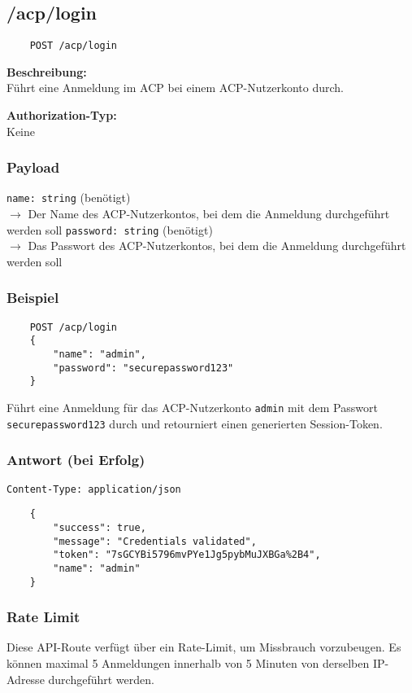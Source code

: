 \subsection{/acp/login}
\label{acpauth}

\begin{lstlisting}
    POST /acp/login
\end{lstlisting}

\textbf{Beschreibung:} \\
Führt eine Anmeldung im ACP bei einem ACP-Nutzerkonto durch.

\textbf{Authorization-Typ:} \\
Keine

\subsubsection{Payload}

\lstinline{name: string} (benötigt) \\
$\rightarrow$ Der Name des ACP-Nutzerkontos, bei dem die Anmeldung durchgeführt werden soll
\lstinline{password: string} (benötigt) \\
$\rightarrow$ Das Passwort des ACP-Nutzerkontos, bei dem die Anmeldung durchgeführt werden soll

\subsubsection{Beispiel}

\begin{lstlisting}
    POST /acp/login
    {
        "name": "admin",
        "password": "securepassword123"
    }
\end{lstlisting}

Führt eine Anmeldung für das ACP-Nutzerkonto \lstinline{admin} mit dem Passwort \lstinline{securepassword123} durch und retourniert einen generierten Session-Token.

\subsubsection{Antwort (bei Erfolg)}

\lstinline{Content-Type: application/json}
\begin{lstlisting}
    {
        "success": true, 
        "message": "Credentials validated",
        "token": "7sGCYBi5796mvPYe1Jg5pybMuJXBGa%2B4",
        "name": "admin"
    }
\end{lstlisting}

\subsubsection{Rate Limit}

Diese API-Route verfügt über ein Rate-Limit, um Missbrauch vorzubeugen. Es können maximal 5 Anmeldungen innerhalb von 5 Minuten von derselben IP-Adresse durchgeführt werden.